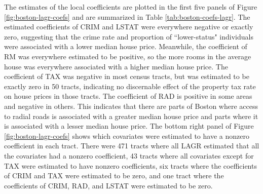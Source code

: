 \documentclass[authoryear,review, 12pt]{elsarticle}
\begin{document}
The estimates of the local coefficients are plotted in the first five panels of Figure \ref{fig:boston-lagr-coefs} and are summarized in Table \ref{tab:boston-coefs-lagr}.
The estimated coefficients of CRIM and LSTAT were everywhere negative or exactly zero, suggesting that the crime rate and proportion of ``lower-status" individuals were associated with a lower median house price. 
Meanwhile, the coefficient of RM was everywhere estimated to be positive, so the more rooms in the average house was everywhere associated with a higher median house price.
The coefficient of TAX was negative in most census tracts, but was estimated to be exactly zero in 50 tracts, indicating no discernable effect of the property tax rate on house prices in those tracts.
The coefficient of RAD is positive in some areas and negative
in others. This indicates that there are parts of Boston where access
to radial roads is associated with a greater median house price and
parts where it is associated with a lesser median house price.
The bottom right panel of Figure \ref{fig:boston-lagr-coefs} shows which covariates were estimated to have a nonzero coefficient in each tract.
There were 471 tracts where all LAGR estimated that all the covariates had a nonzero coefficient, 43 tracts where all covariates except for TAX were estimated to have nonzero coefficients, six tracts where the coefficients of CRIM and TAX were estimated to be zero, and one tract where the coefficients of CRIM, RAD, and LSTAT were estimated to be zero.

\end{document}
